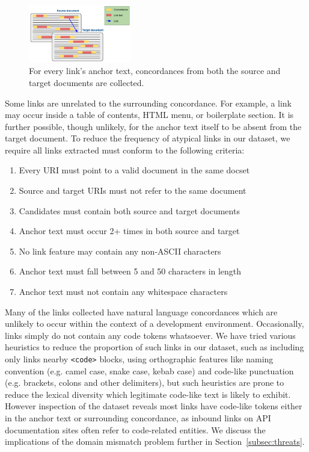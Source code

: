 \documentclass[sigconf,authordraft]{acmart}
\begin{document}
\begin{figure}
    \centering
    \includegraphics[width=0.4\textwidth,keepaspectratio]{concordance.png}
    \caption{For every link's anchor text, concordances from both the source and target documents are collected.}
    \label{fig:concordances}
\end{figure}

Some links are unrelated to the surrounding concordance. For example, a link may occur inside a table of contents, HTML menu, or boilerplate section. It is further possible, though unlikely, for the anchor text itself to be absent from the target document. To reduce the frequency of atypical links in our dataset, we require all links extracted must conform to the following criteria:

\begin{enumerate}
\item Every URI must point to a valid document in the same docset
\item Source and target URIs must not refer to the same document
\item Candidates must contain both source and target documents
\item Anchor text must occur 2+ times in both source and target
\item No link feature may contain any non-ASCII characters
\item Anchor text must fall between 5 and 50 characters in length
\item Anchor text must not contain any whitespace characters
\end{enumerate}

Many of the links collected have natural language concordances which are unlikely to occur within the context of a development environment. Occasionally, links simply do not contain any code tokens whatsoever. We have tried various heuristics to reduce the proportion of such links in our dataset, such as including only links nearby \texttt{<code>} blocks, using orthographic features like naming convention (e.g. camel case, snake case, kebab case) and code-like punctuation (e.g. brackets, colons and other delimiters), but such heuristics are prone to reduce the lexical diversity which legitimate code-like text is likely to exhibit. However inspection of the dataset reveals most links have code-like tokens either in the anchor text or surrounding concordance, as inbound links on API documentation sites often refer to code-related entities. We discuss the implications of the domain mismatch problem further in Section~\ref{subsec:threats}.
\end{document}
